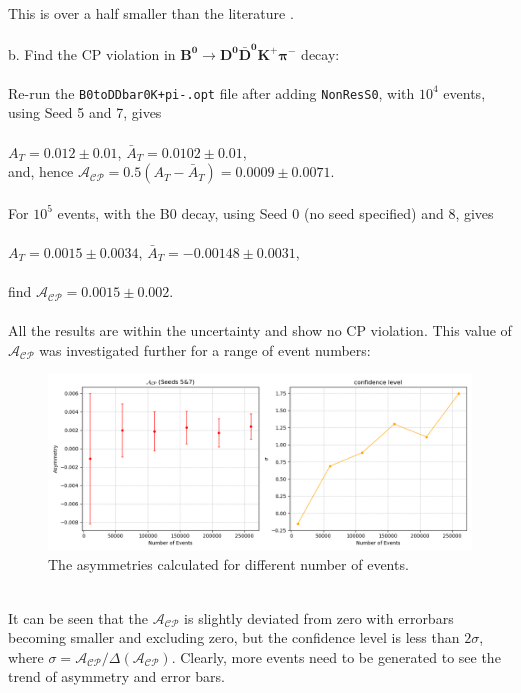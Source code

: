 \\
This is over a half smaller than the literature \autocite{Aaij_2014}.
\\
\\
b. Find the CP violation in $\bm{B^0\to D^0\bar{D}^0K^+\pi^-}$ decay:
\\
\\
Re-run the \texttt{B0toDDbar0K+pi-.opt} file after adding \texttt{NonResS0}, with $10^4$ events, using Seed 5 and 7, gives
\\
\\
\indent $A_T=0.012\pm0.01$, $\bar{A}_T = 0.0102\pm0.01$,
\\
\indent and, hence $\mathcal{A}_{\mathcal{C}\mathcal{P}} = 0.5 (A_T-\bar{A}_T)=0.0009\pm 0.0071$.
\\
\\
For $10^5$ events, with the B0 decay, using Seed 0 (no seed specified) and 8, gives
\\
\\
\indent $A_T = 0.0015 \pm 0.0034$, $\bar{A}_T = -0.00148 \pm 0.0031$,
\\
\\
find $\mathcal{A}_{\mathcal{C}\mathcal{P}} = 0.0015 \pm 0.002$.
\\
\\
All the results are within the uncertainty and show no CP violation.
\clearpage
This value of $\mathcal{A}_{\mathcal{C}\mathcal{P}}$ was investigated further for a range of event numbers:
\\
\begin{figure}[h]
\center
\includegraphics*[width=0.96\linewidth]{a_cp/acp_primary}
\caption{The asymmetries calculated for different number of events.}
\label{acp_nospd}
\end{figure}
\\
It can be seen that the $\mathcal{A}_{\mathcal{C}\mathcal{P}}$ is slightly deviated from zero with errorbars becoming smaller and excluding zero, but the confidence level is less than $2\sigma$, where $\sigma = \mathcal{A}_{\mathcal{C}\mathcal{P}}/\Delta(\mathcal{A}_{\mathcal{C}\mathcal{P}})$. Clearly, more events need to be generated to see the trend of asymmetry and error bars.

